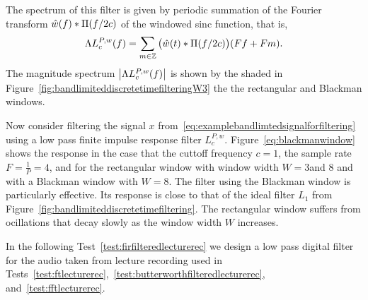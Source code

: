 The spectrum of this filter is given by periodic summation of the Fourier transform $\hat{w}(f) * \Pi(f/2c)$ of the windowed sinc function, that is,
\[
\Lambda L_c^{P,w}(f) = \sum_{m \in {\mathbb Z}} \big(\hat{w}(t) *  \Pi(f/2c) \big)(Ff + Fm).
\]
The magnitude spectrum $\left\vert \Lambda L_c^{P,w}(f) \right\vert$ is shown by the shaded in Figure~\ref{fig:bandlimiteddiscretetimefilteringW3} the the rectangular and Blackman windows. 

Now consider filtering the signal $x$ from~\eqref{eq:examplebandlimtedsignalforfiltering} using a low pass finite impulse response filter $L_c^{P,w}$.  Figure~\ref{eq:blackmanwindow} shows  the response in the case that the cuttoff frequency $c = 1$, the sample rate $F = \tfrac{1}{P} = 4$, and for the rectangular window with window width $W = 3 $and $8$ and with a Blackman window with $W = 8$.  The filter using the Blackman window is particularly effective.  Its response is close to that of the ideal filter $L_1$ from Figure~\ref{fig:bandlimiteddiscretetimefiltering}.  The rectangular window suffers from ocillations that decay slowly as the window width $W$ increases. 

In the following Test~\ref{test:firfilteredlecturerec} we design a low pass digital filter for the audio taken from lecture recording used in Tests~\ref{test:ftlecturerec},~\ref{test:butterworthfilteredlecturerec}, and~\ref{test:fftlecturerec}.

